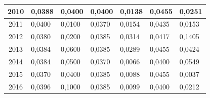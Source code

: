\begin{table}[H]
\begin{tabular}{|c|l|l|l|l|l|l|}
		2010            & 0,0388                                                 & 0,0400                                                    & 0,0400                                                       & 0,0138                                                    & 0,0455                                                      & 0,0251                                                      \\ \hline
		2011            & 0,0400                                                   & 0,0100                                                    & 0,0370                                                      & 0,0154                                                    & 0,0435                                                      & 0,0153                                                      \\ \hline
		2012            & 0,0380                                                  & 0,0200                                                    & 0,0385                                                     & 0,0314                                                    & 0,0417                                                      & 0,1405                                                      \\ \hline
		2013            & 0,0384                                                 & 0,0600                                                    & 0,0385                                                     & 0,0289                                                    & 0,0455                                                      & 0,0424                                                      \\ \hline
		2014            & 0,0384                                                 & 0,0500                                                    & 0,0370                                                      & 0,0066                                                    & 0,0400                                                        & 0,0549                                                      \\ \hline
		2015            & 0,0370                                                  & 0,0400                                                    & 0,0385                                                     & 0,0088                                                    & 0,0455                                                      & 0,0037                                                      \\ \hline
		2016            & 0,0396                                                 & 0,1000                                                     & 0,0385                                                     & 0,0099                                                    & 0,0400                                                        & 0,0212                                                      \\ \hline

\end{tabular}
\end{table}
